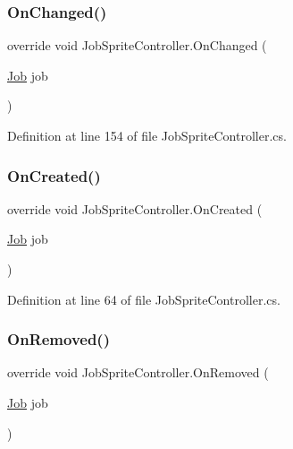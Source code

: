 \subsubsection{\texorpdfstring{On\+Changed()}{OnChanged()}}
{\footnotesize\ttfamily override void Job\+Sprite\+Controller.\+On\+Changed (\begin{DoxyParamCaption}\item[{\hyperlink{class_job}{Job}}]{job }\end{DoxyParamCaption})\hspace{0.3cm}{\ttfamily [protected]}}



Definition at line 154 of file Job\+Sprite\+Controller.\+cs.

\mbox{\label{class_job_sprite_controller_a5b23ec5cf4c9cbb179d356271638cdbf}} 
\subsubsection{\texorpdfstring{On\+Created()}{OnCreated()}}
{\footnotesize\ttfamily override void Job\+Sprite\+Controller.\+On\+Created (\begin{DoxyParamCaption}\item[{\hyperlink{class_job}{Job}}]{job }\end{DoxyParamCaption})\hspace{0.3cm}{\ttfamily [protected]}}



Definition at line 64 of file Job\+Sprite\+Controller.\+cs.

\mbox{\label{class_job_sprite_controller_afb4a365c93a9b909cb4634a4e800d818}} 
\subsubsection{\texorpdfstring{On\+Removed()}{OnRemoved()}}
{\footnotesize\ttfamily override void Job\+Sprite\+Controller.\+On\+Removed (\begin{DoxyParamCaption}\item[{\hyperlink{class_job}{Job}}]{job }\end{DoxyParamCaption})\hspace{0.3cm}{\ttfamily [protected]}}



